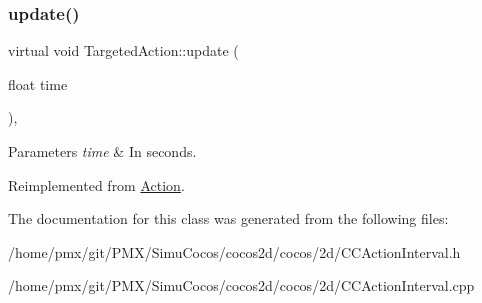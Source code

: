 \mbox{\label{classTargetedAction_a95ad5a7c4384449e147f0200d1c4b84b}} 
\subsubsection{\texorpdfstring{update()}{update()}\hspace{0.1cm}{\footnotesize\ttfamily [2/2]}}
{\footnotesize\ttfamily virtual void Targeted\+Action\+::update (\begin{DoxyParamCaption}\item[{float}]{time }\end{DoxyParamCaption})\hspace{0.3cm}{\ttfamily [override]}, {\ttfamily [virtual]}}


\begin{DoxyParams}{Parameters}
{\em time} & In seconds. \\
\hline
\end{DoxyParams}


Reimplemented from \hyperlink{classAction_a937e646e63915e33ad05ba149bfcf239}{Action}.



The documentation for this class was generated from the following files\+:\begin{DoxyCompactItemize}
\item 
/home/pmx/git/\+P\+M\+X/\+Simu\+Cocos/cocos2d/cocos/2d/C\+C\+Action\+Interval.\+h\item 
/home/pmx/git/\+P\+M\+X/\+Simu\+Cocos/cocos2d/cocos/2d/C\+C\+Action\+Interval.\+cpp\end{DoxyCompactItemize}

